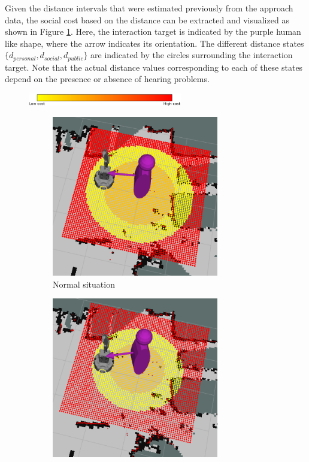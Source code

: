 \documentclass[a4paper,11pt]{report}
\begin{document}
Given the distance intervals that were estimated previously from the approach data, the social cost based on the distance can be extracted and visualized as shown in Figure \ref{fig:state_res_distance_1}. Here, the interaction target is indicated by the purple human like shape, where the arrow indicates its orientation. The different distance states $\{d_{personal}, d_{social}, d_{public}\}$ are indicated by the circles surrounding the interaction target. Note that the actual distance values corresponding to each of these states depend on the presence or absence of hearing problems.

\begin{figure}
    \centering
    \includegraphics[width=0.6\textwidth]{figures/colour_bar.png}
    \begin{subfigure}[b]{0.45\textwidth}
        \includegraphics[width=0.8\textwidth]{figures/cost_function_no_hearing_problems.png}
        \caption{Normal situation}
        \label{fig:state_res_distance_1}
    \end{subfigure}
    \begin{subfigure}[b]{0.45\textwidth}
        \includegraphics[width=0.8\textwidth]{figures/cost_function_hearing_problems.png}

\end{subfigure}
\end{figure}
\end{document}
